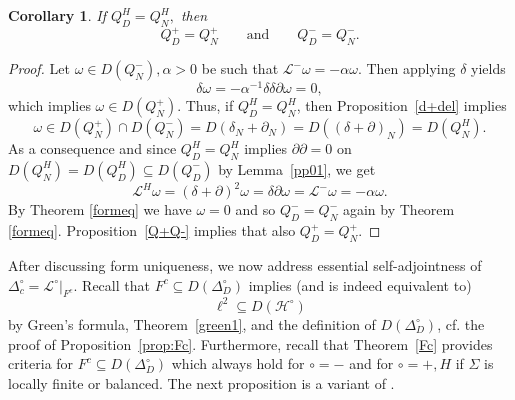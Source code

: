 \documentclass[10pt]{amsart}
\newtheorem{corollary}[theorem]{Corollary}
\theoremstyle{definition}
\newtheorem*{remark}{Remark}
\renewcommand{\bullet}{{\circ}}
\begin{document}
\begin{corollary}\label{QH->Q+Q-}
	If  $ Q^H_{D} = Q^H_N,$ then
	\begin{equation*}
		Q^+_{D} = Q^+_N\qquad\mbox{and}\qquad Q^-_{D} = Q^-_N.
	\end{equation*}		
\end{corollary}
\begin{proof}Let $\omega\in D(Q^-_N),\alpha>0$ be such that $\mathcal{L}^-\omega =-\alpha\omega.$ Then applying $\delta$ yields $$\delta\omega = -\alpha^{-1}\delta\delta\partial\omega = 0,$$
which implies $\omega\in D(Q^{+}_{N})$.	Thus, if $Q^H_{D} = Q^H_N$, then Proposition~\ref{d+del} implies 
$$\omega\in D(Q^+_N)\cap D(Q^-_N) = D(\delta_N+\partial_N) = D((\delta+\partial)_N) =D(Q^H_N).$$  As a consequence  and since  $ Q^H_{D} = Q^H_N$ implies  $\partial\partial =0$ on $D(Q^{H}_{N})=D(Q^{H}_{D})\subseteq D(Q^{-}_{D})$ by Lemma~\ref{pp01}, we get
	$$\mathcal{L}^H\omega = (\delta+\partial)^2\omega = \delta\partial\omega =\mathcal{L}^{-}\omega= -\alpha\omega.$$
	By Theorem \ref{formeq} we have $\omega = 0$ and so $Q^-_{D} = Q^-_N$ again by Theorem \ref{formeq}. Proposition~\ref{Q+Q-} implies that also $Q^+_{D} = Q^+_N.$	
\end{proof}

 
After discussing form uniqueness, we now address essential self-adjointness of $\Delta^\bullet_{c}=\mathcal{L}^{\circ}\vert_{F^{c}}$. Recall that  $F^c\subseteq D(\Delta^\bullet_{D})$ implies (and is indeed equivalent to) $$\ell^{2}\subseteq D(\mathcal{H}^{\bullet})$$
by Green's formula, Theorem~\ref{green1}, and the definition of $D(\Delta^\bullet_{D})$, cf. the proof of
 Proposition~\ref{prop:Fc}.  Furthermore, recall that Theorem~\ref{Fc} provides criteria for $F^c\subseteq D(\Delta^\bullet_{D})$ which always hold for $\bullet=-$ and  for $\bullet=+,H$ if $\Sigma $ is locally finite or balanced. The next proposition is a variant of \cite[Theorem~3.6]{KLW}.
 
\end{document}
